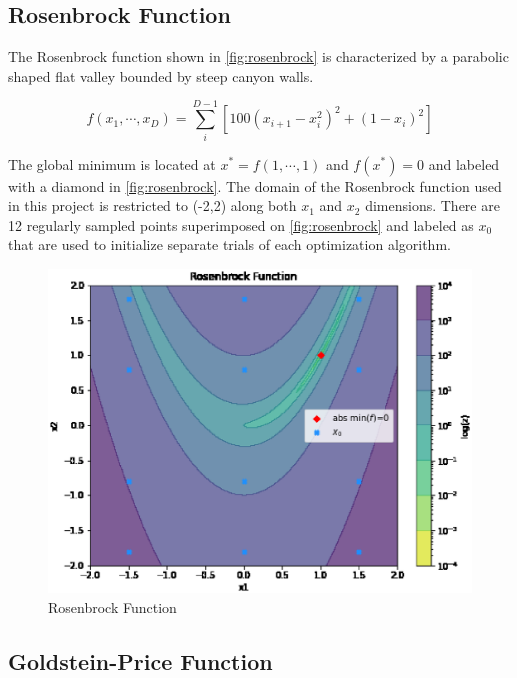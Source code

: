 \documentclass{vgtc}                          %
\begin{document}
\subsection{Rosenbrock Function}

The Rosenbrock function \cite{Rosenbrock:1960} shown in \autoref{fig:rosenbrock} is characterized by a parabolic shaped flat valley bounded by steep canyon walls.

\begin{equation}
f(x_1, \cdots, x_D) = \sum_{i}^{D-1} [ 100(x_{i+1} - x_i^2)^2 + (1 - x_i)^2]
\end{equation}

The global minimum is located at $x^* = f(1, \cdots, 1)$ and $f(x^*) = 0$ and labeled with a diamond in \autoref{fig:rosenbrock}.  The domain of the Rosenbrock function used in this project is restricted to (-2,2) along both $x_1$ and $x_2$ dimensions.  There are 12 regularly sampled points superimposed on \autoref{fig:rosenbrock} and labeled as $x_0$ that are used to initialize separate trials of each optimization algorithm.

\begin{figure}[tb]
\centering
\includegraphics[width=\columnwidth]{figures/pictures/images/rosenbrock-plot2d.eps}
\caption{Rosenbrock Function}
\label{fig:rosenbrock}
\end{figure}

\subsection{Goldstein-Price Function}
\end{document}
